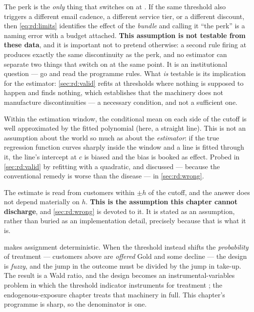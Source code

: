 \begin{assumption}\label{as:rd:only}
The perk is the \emph{only} thing that switches on at \eur{\nbNineCutoff}. If the same threshold
also triggers a different email cadence, a different service tier, or a different discount, then
\cref{eq:rd:limits} identifies the effect of the \emph{bundle} and calling it ``the perk'' is a
naming error with a budget attached. \textbf{This assumption is not testable from these data}, and
it is important not to pretend otherwise: a second rule firing at \eur{\nbNineCutoff} produces
exactly the same discontinuity as the perk, and no estimator can separate two things that switch on
at the same point. It is an institutional question --- go and read the programme rules. What
\emph{is} testable is its implication for the estimator: \cref{sec:rd:valid} refits at
\nbNinePlaceboN{} thresholds where nothing is supposed to happen and finds nothing, which
establishes that the machinery does not manufacture discontinuities --- a necessary condition, and
not a sufficient one.
\end{assumption}

\begin{assumption}\label{as:rd:poly}
Within the estimation window, the conditional mean on each side of the cutoff is well approximated
by the fitted polynomial (here, a straight line). This is not an assumption about the world so much
as about the \emph{estimator}: if the true regression function curves sharply inside the window and
a line is fitted through it, the line's intercept at $c$ is biased and the bias is booked as
effect. Probed in \cref{sec:rd:valid} by refitting with a quadratic, and discussed --- because the
conventional remedy is worse than the disease --- in \cref{sec:rd:wrong}.
\end{assumption}

\begin{assumption}\label{as:rd:bw}
The estimate is read from customers within $\pm h$ of the cutoff, and the answer does not depend
materially on $h$. \textbf{This is the assumption this chapter cannot discharge}, and
\cref{sec:rd:wrong} is devoted to it. It is stated as an assumption, rather than buried as an
implementation detail, precisely because that is what it is.
\end{assumption}

\begin{remark}
 makes assignment deterministic. When the threshold instead shifts the
\emph{probability} of treatment --- customers above \eur{\nbNineCutoff} are \emph{offered} Gold and
some decline --- the design is \emph{fuzzy}, and the jump in the outcome must be divided by the
jump in take-up. The result is a Wald ratio, and the design becomes an instrumental-variables
problem in which the threshold indicator instruments for treatment
\citep{hahn2001, imbens1994}; the endogenous-exposure chapter treats that machinery in full. This
chapter's programme is sharp, so the denominator is one.
\end{remark}

